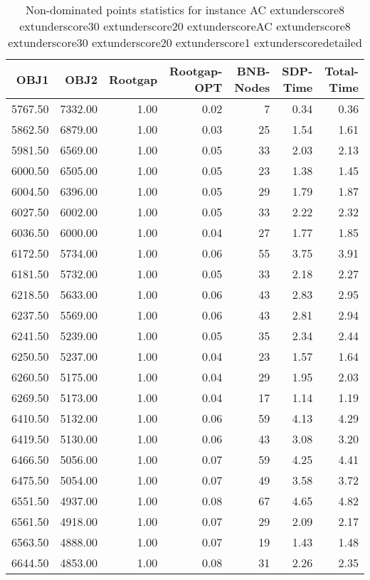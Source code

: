 \begin{table}
\caption{Non-dominated points statistics for instance AC	extunderscore8	extunderscore30	extunderscore20	extunderscoreAC	extunderscore8	extunderscore30	extunderscore20	extunderscore1	extunderscoredetailed}
\label{tab:stats/AC_8_30_20_AC_8_30_20_1_detailed}
\begin{tabular}{rrrrrrr}
\toprule
OBJ1 & OBJ2 & Rootgap & Rootgap-OPT & BNB-Nodes & SDP-Time & Total-Time \\
\midrule
5767.50 & 7332.00 & 1.00 & 0.02 & 7 & 0.34 & 0.36 \\
5862.50 & 6879.00 & 1.00 & 0.03 & 25 & 1.54 & 1.61 \\
5981.50 & 6569.00 & 1.00 & 0.05 & 33 & 2.03 & 2.13 \\
6000.50 & 6505.00 & 1.00 & 0.05 & 23 & 1.38 & 1.45 \\
6004.50 & 6396.00 & 1.00 & 0.05 & 29 & 1.79 & 1.87 \\
6027.50 & 6002.00 & 1.00 & 0.05 & 33 & 2.22 & 2.32 \\
6036.50 & 6000.00 & 1.00 & 0.04 & 27 & 1.77 & 1.85 \\
6172.50 & 5734.00 & 1.00 & 0.06 & 55 & 3.75 & 3.91 \\
6181.50 & 5732.00 & 1.00 & 0.05 & 33 & 2.18 & 2.27 \\
6218.50 & 5633.00 & 1.00 & 0.06 & 43 & 2.83 & 2.95 \\
6237.50 & 5569.00 & 1.00 & 0.06 & 43 & 2.81 & 2.94 \\
6241.50 & 5239.00 & 1.00 & 0.05 & 35 & 2.34 & 2.44 \\
6250.50 & 5237.00 & 1.00 & 0.04 & 23 & 1.57 & 1.64 \\
6260.50 & 5175.00 & 1.00 & 0.04 & 29 & 1.95 & 2.03 \\
6269.50 & 5173.00 & 1.00 & 0.04 & 17 & 1.14 & 1.19 \\
6410.50 & 5132.00 & 1.00 & 0.06 & 59 & 4.13 & 4.29 \\
6419.50 & 5130.00 & 1.00 & 0.06 & 43 & 3.08 & 3.20 \\
6466.50 & 5056.00 & 1.00 & 0.07 & 59 & 4.25 & 4.41 \\
6475.50 & 5054.00 & 1.00 & 0.07 & 49 & 3.58 & 3.72 \\
6551.50 & 4937.00 & 1.00 & 0.08 & 67 & 4.65 & 4.82 \\
6561.50 & 4918.00 & 1.00 & 0.07 & 29 & 2.09 & 2.17 \\
6563.50 & 4888.00 & 1.00 & 0.07 & 19 & 1.43 & 1.48 \\
6644.50 & 4853.00 & 1.00 & 0.08 & 31 & 2.26 & 2.35 \\

\end{tabular}
\end{table}
